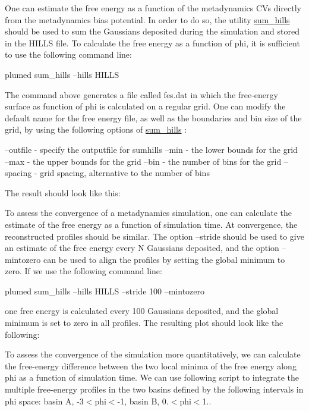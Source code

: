 One can estimate the free energy as a function of the metadynamics C\+Vs directly from the metadynamics bias potential. In order to do so, the utility \hyperlink{sum_hills}{sum\+\_\+hills} should be used to sum the Gaussians deposited during the simulation and stored in the H\+I\+L\+L\+S file. To calculate the free energy as a function of phi, it is sufficient to use the following command line\+:

\begin{DoxyVerb}plumed sum_hills --hills HILLS
\end{DoxyVerb}


The command above generates a file called fes.\+dat in which the free-\/energy surface as function of phi is calculated on a regular grid. One can modify the default name for the free energy file, as well as the boundaries and bin size of the grid, by using the following options of \hyperlink{sum_hills}{sum\+\_\+hills} \+:

\begin{DoxyVerb}--outfile - specify the outputfile for sumhills
--min - the lower bounds for the grid
--max - the upper bounds for the grid
--bin - the number of bins for the grid
--spacing - grid spacing, alternative to the number of bins
\end{DoxyVerb}


The result should look like this\+:

\label{munster_munster-metad-phifes-fig}%
\hypertarget{munster_munster-metad-phifes-fig}{}%
 To assess the convergence of a metadynamics simulation, one can calculate the estimate of the free energy as a function of simulation time. At convergence, the reconstructed profiles should be similar. The option --stride should be used to give an estimate of the free energy every N Gaussians deposited, and the option --mintozero can be used to align the profiles by setting the global minimum to zero. If we use the following command line\+:

\begin{DoxyVerb}plumed sum_hills --hills HILLS --stride 100 --mintozero
\end{DoxyVerb}


one free energy is calculated every 100 Gaussians deposited, and the global minimum is set to zero in all profiles. The resulting plot should look like the following\+:

\label{munster_munster-metad-phifest-fig}%
\hypertarget{munster_munster-metad-phifest-fig}{}%
 To assess the convergence of the simulation more quantitatively, we can calculate the free-\/energy difference between the two local minima of the free energy along phi as a function of simulation time. We can use following script to integrate the multiple free-\/energy profiles in the two basins defined by the following intervals in phi space\+: basin A, -\/3$<$phi$<$-\/1, basin B, 0.$<$phi$<$1..

